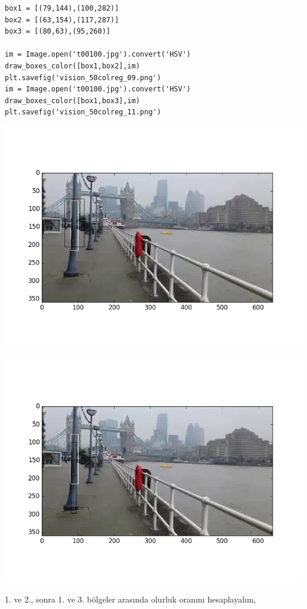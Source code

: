 \documentclass[12pt,fleqn]{article}\usepackage{../../common}
\begin{document}
\begin{verbatim}
box1 = [(79,144),(100,282)]
box2 = [(63,154),(117,287)]
box3 = [(80,63),(95,260)]

im = Image.open('t00100.jpg').convert('HSV')
draw_boxes_color([box1,box2],im)
plt.savefig('vision_50colreg_09.png')
im = Image.open('t00100.jpg').convert('HSV')
draw_boxes_color([box1,box3],im)
plt.savefig('vision_50colreg_11.png')
\end{verbatim}

\includegraphics[height=10cm]{vision_50colreg_09.png}

\includegraphics[height=10cm]{vision_50colreg_11.png}

1. ve 2., sonra 1. ve 3. bölgeler arasında olurluk oranını hesaplayalım,
\end{document}
